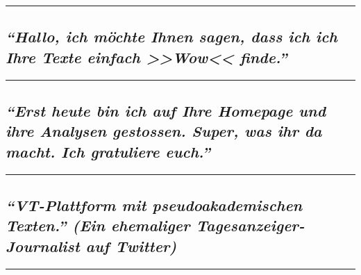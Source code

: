 \begin{center}\rule{0.5\linewidth}{\linethickness}\end{center}

\hypertarget{hallo-ich-muxf6chte-ihnen-sagen-dass-ich-ich-ihre-texte-einfach-wow-finde}{%
\subsection{\texorpdfstring{\emph{``Hallo, ich möchte Ihnen sagen, dass
ich ich Ihre Texte einfach
\textgreater{}\textgreater{}Wow\textless{}\textless{}
finde.''}}{``Hallo, ich möchte Ihnen sagen, dass ich ich Ihre Texte einfach \textgreater{}\textgreater{}Wow\textless{}\textless{} finde.''}}\label{hallo-ich-muxf6chte-ihnen-sagen-dass-ich-ich-ihre-texte-einfach-wow-finde}}

\begin{center}\rule{0.5\linewidth}{\linethickness}\end{center}

\hypertarget{erst-heute-bin-ich-auf-ihre-homepage-und-ihre-analysen-gestossen-super-was-ihr-da-macht-ich-gratuliere-euch}{%
\subsection{\texorpdfstring{\emph{``Erst heute bin ich auf Ihre Homepage
und ihre Analysen gestossen. Super, was ihr da macht. Ich gratuliere
euch.''}}{``Erst heute bin ich auf Ihre Homepage und ihre Analysen gestossen. Super, was ihr da macht. Ich gratuliere euch.''}}\label{erst-heute-bin-ich-auf-ihre-homepage-und-ihre-analysen-gestossen-super-was-ihr-da-macht-ich-gratuliere-euch}}

\begin{center}\rule{0.5\linewidth}{\linethickness}\end{center}

\hypertarget{vt-plattform-mit-pseudoakademischen-texten-ein-ehemaliger-tagesanzeiger-journalist-auf-twitter}{%
\subsection{\texorpdfstring{\emph{``VT-Plattform mit pseudoakademischen
Texten.'' (Ein ehemaliger Tagesanzeiger-Journalist auf
Twitter)}}{``VT-Plattform mit pseudoakademischen Texten.'' (Ein ehemaliger Tagesanzeiger-Journalist auf Twitter)}}\label{vt-plattform-mit-pseudoakademischen-texten-ein-ehemaliger-tagesanzeiger-journalist-auf-twitter}}

\begin{center}\rule{0.5\linewidth}{\linethickness}\end{center}

